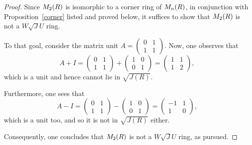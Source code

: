 \documentclass[10pt,a4paper]{amsart}
\begin{document}
\begin{proof} Since \( {\rm M}_2(R) \) is isomorphic to a corner ring of \( {\rm M}_n(R) \), in conjunction with Proposition~\ref{corner} listed and proved below, it suffices to show that \( {\rm M}_2(R) \) is not a $W\sqrt{J}U$ ring.

To that goal, consider the matrix unit $A = \begin{pmatrix} 0 & 1 \\ 1 & 1 \end{pmatrix}$. Now, one observes that
\[ A + I =
\begin{pmatrix} 0 & 1 \\ 1 & 1 \end{pmatrix} + \begin{pmatrix} 1 & 0 \\ 0 & 1 \end{pmatrix} = \begin{pmatrix} 1
& 1 \\ 1 & 2 \end{pmatrix}, \] which is a unit and hence cannot lie in $\sqrt{J(R)}$.

Furthermore, one sees that \[ A - I = \begin{pmatrix} 0 & 1 \\ 1 & 1 \end{pmatrix} - \begin{pmatrix} 1 & 0 \\ 0 & 1
\end{pmatrix} = \begin{pmatrix} -1 & 1 \\ 1 & 0 \end{pmatrix}, \] which is a unit too, and so it is not in
$\sqrt{J(R)}$ either.

Consequently, one concludes that \( {\rm M}_2(R) \) is not a $W\sqrt{J}U$ ring, as pursued.
\end{proof}
\end{document}
